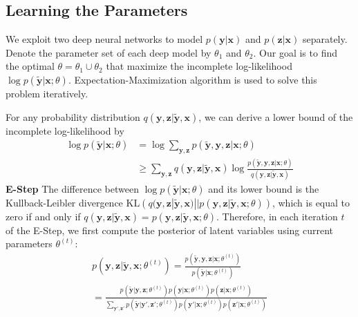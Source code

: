 \documentclass[10pt,twocolumn,letterpaper]{article}
\def\vec{\mathbf}
\begin{document}
\subsection{Learning the Parameters} %
\label{sub:learning_the_parameters}
We exploit two deep neural networks to model $p(\vec{y} | \vec{x})$ and $p(\vec{z} | \vec{x})$ separately. Denote the parameter set of each deep model by $\theta_1$ and $\theta_2$. Our goal is to find the optimal $\theta = \theta_1 \cup \theta_2$ that maximize the incomplete log-likelihood $\log p(\tilde{\vec{y}} | \vec{x}; \theta)$. Expectation-Maximization algorithm is used to solve this problem iteratively.

For any probability distribution $q(\vec{y}, \vec{z} | \tilde{\vec{y}}, \vec{x})$, we can derive a lower bound of the incomplete log-likelihood by
\begin{equation}
\begin{aligned}
    \log p(\tilde{\vec{y}} | \vec{x}; \theta) &= \log \sum_{\vec{y},\vec{z}} p(\tilde{\vec{y}}, \vec{y}, \vec{z} | \vec{x}; \theta) \\
    &\geq \sum_{\vec{y},\vec{z}} q(\vec{y}, \vec{z} | \tilde{\vec{y}}, \vec{x}) \log \frac{p(\tilde{\vec{y}}, \vec{y}, \vec{z} | \vec{x}; \theta)}{q(\vec{y}, \vec{z} | \tilde{\vec{y}}, \vec{x})}
\end{aligned}
\end{equation}
\textbf{E-Step} The difference between $\log p(\tilde{\vec{y}} | \vec{x}; \theta)$ and its lower bound is the Kullback-Leibler divergence $\mathrm{KL}\left(q(\vec{y}, \vec{z} | \tilde{\vec{y}}, \vec{x}) || p(\vec{y}, \vec{z} | \tilde{\vec{y}}, \vec{x}; \theta)\right)$, which is equal to zero if and only if $q(\vec{y}, \vec{z} | \tilde{\vec{y}}, \vec{x}) = p(\vec{y}, \vec{z} | \tilde{\vec{y}}, \vec{x}; \theta)$. Therefore, in each iteration $t$ of the E-Step, we first compute the posterior of latent variables using current parameters $\theta^{(t)}$:
\begin{multline} \label{eq:posterior}
    p(\vec{y}, \vec{z} | \tilde{\vec{y}}, \vec{x}; \theta^{(t)}) = \frac{p(\tilde{\vec{y}}, \vec{y}, \vec{z} | \vec{x}; \theta^{(t)})}{p(\tilde{\vec{y}} | \vec{x}; \theta^{(t)})} \\
    = \frac{p(\tilde{\vec{y}}|\vec{y},\vec{z};\theta^{(t)}) p(\vec{y}|\vec{x};\theta^{(t)}) p(\vec{z}|\vec{x};\theta^{(t)})}{\sum_{\vec{y}',\vec{z}'} p(\tilde{\vec{y}}|\vec{y}',\vec{z}';\theta^{(t)}) p(\vec{y}'|\vec{x};\theta^{(t)}) p(\vec{z}'|\vec{x};\theta^{(t)})}
\end{multline}
\end{document}
